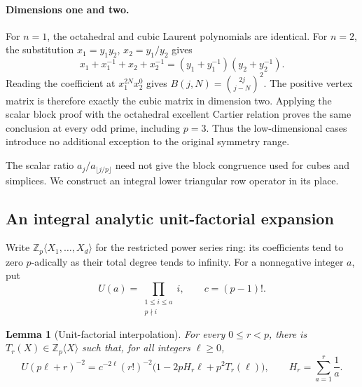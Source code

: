 \documentclass[11pt,a4paper]{article}
\newtheorem{lemma}[theorem]{Lemma}
\theoremstyle{definition}\newtheorem{definition}[theorem]{Definition}
\theoremstyle{remark}\newtheorem{remark}[theorem]{Remark}
\numberwithin{equation}{section}
\begin{document}
\paragraph{Dimensions one and two.}
For \(n=1\), the octahedral and cubic Laurent polynomials are
identical.  For \(n=2\), the substitution
\(x_1=y_1y_2\), \(x_2=y_1/y_2\) gives
\[
 x_1+x_1^{-1}+x_2+x_2^{-1}
 =(y_1+y_1^{-1})(y_2+y_2^{-1}).
\]
Reading the coefficient at \(x_1^{2N}x_2^0\) gives
\(B(j,N)=\binom{2j}{j-N}^2\).  The positive vertex matrix
is therefore exactly the cubic matrix in dimension two.
Applying the scalar block proof with the octahedral excellent
Cartier relation proves the same conclusion at every odd prime,
including \(p=3\).  Thus the low-dimensional cases introduce
no additional exception to the original symmetry range.

The scalar ratio \(a_j/a_{\lfloor j/p\rfloor}\) need not give
the block congruence used for cubes and simplices.  We construct
an integral lower triangular row operator in its place.

\subsection{An integral analytic unit-factorial expansion}

Write \(\mathbb Z_p\langle X_1,\ldots,X_d\rangle\) for the
restricted power series ring: its coefficients tend to zero
\(p\)-adically as their total degree tends to infinity.
For a nonnegative integer \(a\), put
\[
 U(a)=\prod_{\substack{1\leq i\leq a\\p\nmid i}}i,
 \qquad c=(p-1)!.
\]

\begin{lemma}[Unit-factorial interpolation]
\label{P:lem:octa-unit-factorial}
For every \(0\leq r<p\), there is
\(T_r(X)\in\mathbb Z_p\langle X\rangle\) such that, for all
integers \(\ell\geq0\),
\begin{equation}\label{P:eq:octa-unit-expansion}
 U(p\ell+r)^{-2}
 =c^{-2\ell}(r!)^{-2}
   \bigl(1-2pH_r\ell+p^2T_r(\ell)\bigr),
 \qquad H_r=\sum_{a=1}^r\frac1a.
\end{equation}
\end{lemma}
\end{document}
